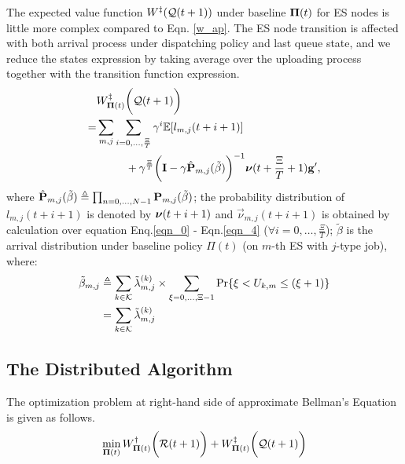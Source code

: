 The expected value function $W^{\ddagger}(\mathcal{Q}({t+1}))$ under baseline $\boldsymbol{\Pi}({t})$ for ES nodes is little more complex compared to Eqn. \ref{w_ap}.
The ES node transition is affected with both arrival process under dispatching policy and last queue state, and we reduce the states expression by taking average over the uploading process together with the transition function expression.
\begin{align}
    &W^{\ddagger}_{\boldsymbol{\Pi}({t})}\bigg(\mathcal{Q}({t+1})\bigg)
    \nonumber\\
    =& \sum_{m,j}\sum_{i=0,\dots,\frac{\Xi}{T}} \gamma^{i} \mathbb{E}[ l_{m,j}({t+i+1}) ]
    \nonumber\\
    &~~~~~~~~+ \gamma^{\frac{\Xi}{T}} \bigg( \mathbf{I} - \gamma \hat{\mathbf{P}}_{m,j}(\tilde{\beta}) \bigg)^{-1} \boldsymbol{\nu}({t+\frac{\Xi}{T}+1}) \mathbf{g}',
\end{align}
where $\hat{\mathbf{P}}_{m,j}(\tilde{\beta}) \triangleq \prod_{n=0,\dots,N-1} \mathbf{P}_{m,j}(\tilde{\beta})$;
the probability distribution of $l_{m,j}({t+i+1})$ is denoted by $\boldsymbol{\nu}({t+i+1})$ and $\vec{\nu}_{m,j}({t+i+1})$ is obtained by calculation over equation Enq.\ref{eqn_0} - Eqn.\ref{eqn_4} ($\forall i=0,\dots,\frac{\Xi}{T}$);
$\tilde{\beta}$ is the arrival distribution under baseline policy $\Pi({t})$ (on $m$-th ES with $j$-type job), where:
\begin{align}
    \tilde{\beta}_{m,j} &\triangleq \sum_{k\in\mathcal{K}} \tilde{\lambda}^{(k)}_{m,j} \times \sum_{\xi=0,\dots,\Xi-1} \Pr\{ \xi<U_{k,m}\leq(\xi+1) \}
        \nonumber\\
    ~~~~&= \sum_{k\in\mathcal{K}} \tilde{\lambda}^{(k)}_{m,j}
\end{align}

\subsection{The Distributed Algorithm}
The optimization problem at right-hand side of approximate Bellman's Equation is given as follows.
\begin{align}
    \min_{\boldsymbol{\Pi}({t})} W^{\dagger}_{\boldsymbol{\Pi}({t})}\bigg(\mathcal{R}({t+1})\bigg) + W^{\ddagger}_{\boldsymbol{\Pi}({t})}\bigg(\mathcal{Q}({t+1})\bigg)
    \label{eqn_opt}
\end{align}

